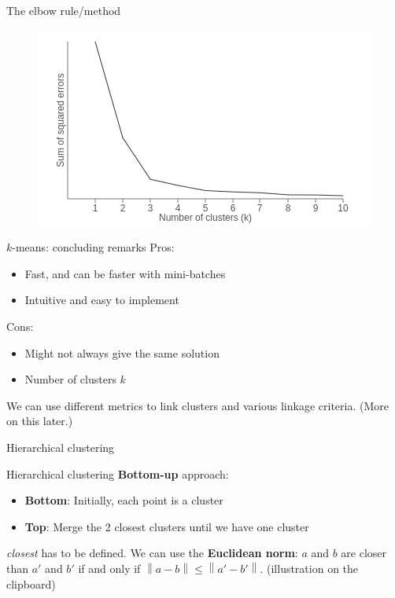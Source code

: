 \documentclass{beamer}
\newcommand{\norm}[1]{\left\lVert#1\right\rVert}
\begin{document}
\begin{frame}{The elbow rule/method}
\begin{figure}
\centering
\includegraphics[width=\textwidth]{images/elbow.png}
\end{figure}
\end{frame}

\begin{frame}{$k$-means: concluding remarks}
Pros:
\begin{itemize}
	\item Fast, and can be faster with mini-batches
	\item Intuitive and easy to implement
\end{itemize}
\vfill
\pause
Cons:
\begin{itemize}
	\item Might not always give the same solution
	\item Number of clusters $k$
\end{itemize}
\vfill
\pause
We can use different metrics to link clusters and various linkage criteria. (More on this later.)
\end{frame}

\begin{frame}
	\center \Huge{Hierarchical clustering}
\end{frame}

\begin{frame}{Hierarchical clustering}
\textbf{Bottom-up} approach:
\begin{itemize}
	\item \textbf{Bottom}: Initially, each point is a cluster
	\item \textbf{Top}: Merge the 2 closest clusters until we have one cluster
\end{itemize}
\vfill
\pause
\textit{closest} has to be defined. We can use the \textbf{Euclidean norm}: $a$ and $b$ are closer than $a'$ and $b'$ if and only if $\norm{a - b} \leq \norm{a' - b'}$.
\pause
\vfill
(illustration on the clipboard)
\end{frame}
\end{document}
